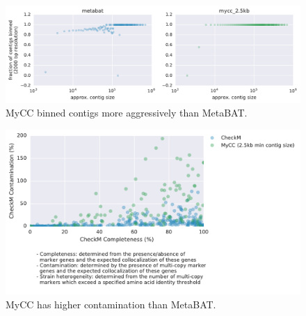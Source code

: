 \begin{figure}[H]
\centering
    \includegraphics[width=1.0\textwidth]{./tex/chapter2/figures/170206_improved_fracs_of_contigs_binned_by_MyCC.pdf}
    \begin{singlespace}
    \caption[MyCC binned contigs more aggressively than MetaBAT.]{
        MyCC binned contigs more aggressively than MetaBAT.}
    \label{fig:mycc_binned_more_contigs}
    \end{singlespace}
\end{figure}


\begin{figure}[H]
\centering
    \includegraphics[width=1.0\textwidth]{./tex/chapter2/figures/170202_MyCC_has_higher_contamination.pdf}
    \begin{singlespace}
    \caption[MyCC has higher contamination than MetaBAT.]{
        MyCC has higher contamination than MetaBAT.}
    \label{fig:mycc_contamination}
    \end{singlespace}
\end{figure}





